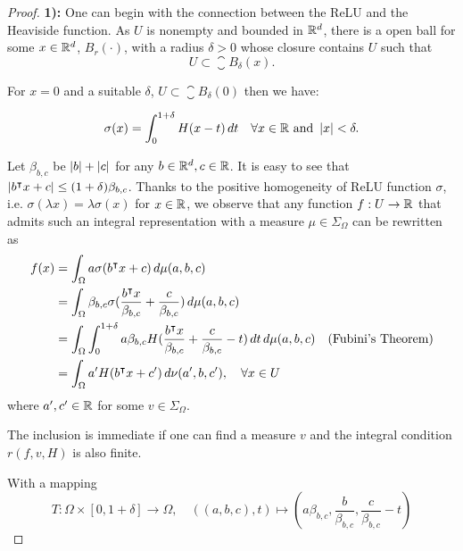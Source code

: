 \begin{proof}


\textbf{1):} 
One can begin with the connection between the ReLU and the Heaviside function.
As $U$ is nonempty and bounded in $\mathbb{R}^d$, there is a open ball for some $x \in
\mathbb{R}^d$, $B_r(\cdot)$, with a radius $\delta > 0$ whose closure contains $U$ such
that
\begin{equation}
    U \subset \closure{B_{\delta}(x)}.
\end{equation}

For $x=0$ and a suitable $\delta$, $U \subset \closure{B_{\delta}(0)}$ then we
have:

\begin{equation}
    \sigma(x) = \int_0^{1+\delta} H(x-t) \,dt 
    \quad \forall x \in \mathbb{R} \textnormal{ and } \left| x \right| < \delta.
\end{equation}

Let $\beta_{b,c}$ be $\left| b \right| + \left| c \right|$ for any $b\in\mathbb{R}^d, c\in\mathbb{R}$. It is easy
to see that $\left| b{}^{\intercal} x + c \right| \leq (1+\delta)\beta_{b,c}$. Thanks to the
positive homogeneity of ReLU function $\sigma$, i.e. $\sigma(\lambda x) =
\lambda \sigma(x)$ for $x \in \mathbb{R}$, we observe that any function $f:U\to\mathbb{R}$ that
admits such an integral representation with a measure $\mu \in \Sigma_{\Omega}$
can be rewritten as
\begin{align*}
    f(x) 
    &= \int_{\Omega} a \sigma(b{}^{\intercal} x + c )\,d\mu(a,b,c) \\
    &= \int_{\Omega} \beta_{b,c} \sigma(
        \frac{b{}^{\intercal} x}{\beta_{b,c}}+ \frac{c}{\beta_{b,c}}
    ) \,d\mu(a,b,c) \\
    &= \int_{\Omega} \int_0^{1+\delta} 
        a\beta_{b,c} H(\frac{b{}^{\intercal} x}{\beta_{b,c}} +
        \frac{c}{\beta_{b,c}} -t)\,dt\,d\mu(a,b,c) \quad
        \text{(Fubini's Theorem)} \\
    &= \int_{\Omega} a' H(b{}^{\intercal} x + c') \,d\nu(a',b,c'), 
    \quad \forall x \in U
\end{align*}
where $a', c' \in \mathbb{R}$ for some $v \in \Sigma_{\Omega}$.

The inclusion is immediate if one can find a measure $v$ and the integral
condition $r(f, v, H)$ is also finite.

With a mapping
\begin{equation}
    T: \Omega \times [0,1+\delta] \to \Omega, \quad 
    ((a,b,c), t) \mapsto
    (a\beta_{b,c}, \frac{b}{\beta_{b,c}}, \frac{c}{\beta_{b,c}} - t)
\end{equation}


\end{proof}

